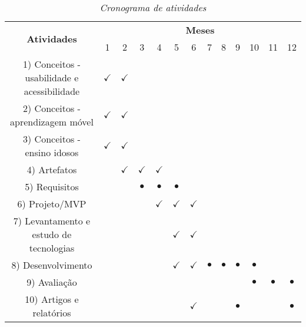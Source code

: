 \begin{table}[!ht]
\centering
\caption{\textit{Cronograma de atividades}}
\label{tab:cronograma}
\begin{tabular}{|c|c|c|c|c|c|c|c|c|c|c|c|c|}
\hline
\multirow{2}{*}{\textbf{Atividades}} & \multicolumn{12}{c|}{\textbf{Meses}} \\ \cline{2-13} 
 & 1 & 2 & 3 & 4 & 5 & 6 & 7 & 8 & 9 & 10 & 11 & 12 \\ \hline
1) Conceitos - usabilidade e acessibilidade & $\checkmark$ & $\checkmark$ &  &  &  &  &  &  &  &  &  &  \\ \hline
2) Conceitos - aprendizagem móvel & $\checkmark$ & $\checkmark$ &  &  &  &  &  &  &  &  &  &  \\ \hline
3) Conceitos - ensino idosos & $\checkmark$ & $\checkmark$ &  &  &  &  &  &  &  &  &  &  \\ \hline
4) Artefatos &  & $\checkmark$ & $\checkmark$ & $\checkmark$ &  &  &  &  &  &  &  &  \\ \hline
5) Requisitos &  &  & $\bullet$ & $\bullet$ & $\bullet$ &  &  &  &  &  &  &  \\ \hline
6) Projeto/MVP &  &  &  & $\checkmark$ & $\checkmark$ & $\checkmark$ &  &  &  &  &  &  \\ \hline
7) Levantamento e estudo de tecnologias &  &  &  &  & $\checkmark$ & $\checkmark$ &  &  &  &  &  &  \\ \hline
8) Desenvolvimento &  &  &  &  & $\checkmark$ & $\checkmark$ & $\bullet$ & $\bullet$ & $\bullet$ & $\bullet$ &  &  \\ \hline
9) Avaliação &  &  &  &  &  &  &  &  &  & $\bullet$ & $\bullet$ & $\bullet$ \\ \hline
10) Artigos e relatórios &  &  &  &  &  & $\checkmark$ &  &  & $\bullet$ &  &  & $\bullet$ \\ \hline
\end{tabular}
\end{table}